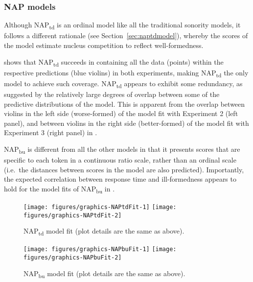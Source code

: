 \subsubsection{NAP models}\label{sec:NAPtdModelfit}\largerpage

Although NAP\textsubscript{td} is an ordinal model like all the traditional sonority models, it follows a different rationale (see Section~\ref{sec:naptdmodel}), whereby the scores of the model estimate nucleus competition to reflect well-formedness.

\begin{sloppypar}
 shows that NAP\textsubscript{td} succeeds in containing all the data (points) within the respective predictions (blue violins) in both experiments, making NAP\textsubscript{td} the only model to achieve such coverage.
NAP\textsubscript{td} appears to exhibit some redundancy, as suggested by the relatively large degrees of overlap between some of the predictive distributions of the model. This is apparent from the overlap between violins in the left side (worse-formed) of the model fit with Experiment 2 (left panel), and between violins in the right side (better-formed) of the model fit with Experiment 3 (right panel) in .
\end{sloppypar}

NAP\textsubscript{bu} is different from all the other models in that it presents scores that are specific to each token in a continuous ratio scale, rather than an ordinal scale (i.e.~the distances between scores in the model are also predicted). 
Importantly, the expected correlation between response time and ill-formedness appears to hold for the model fits of NAP\textsubscript{bu} in .

\begin{figure}
\texttt{[image: figures/graphics-NAPtdFit-1]} \texttt{[image: figures/graphics-NAPtdFit-2]} \caption{NAP\textsubscript{td} model fit (plot details are the same as above).}\label{fig:NAPtdFit}
\end{figure}

\begin{figure}
\texttt{[image: figures/graphics-NAPbuFit-1]} \texttt{[image: figures/graphics-NAPbuFit-2]} \caption{NAP\textsubscript{bu} model fit (plot details are the same as above).}\label{fig:NAPbuFit}
\end{figure}

